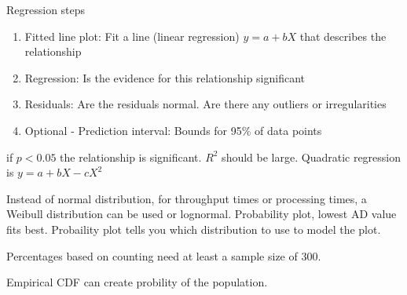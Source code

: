 \documentclass{notes}
\begin{document}
Regression steps
\begin{enumerate}
    \item Fitted line plot: Fit a line (linear regression) $y = a + bX$ that describes the relationship
    \item Regression: Is the evidence for this relationship significant
    \item Residuals: Are the residuals normal. Are there any outliers or irregularities
    \item Optional - Prediction interval: Bounds for 95\% of data points
\end{enumerate}
if $p<0.05$ the relationship is significant. $R^2$ should be large.
Quadratic regression is $y=a+bX-cX^2$

Instead of normal distribution, for throughput times or processing times, a Weibull distribution can be used or lognormal. 
Probability plot, lowest AD value fits best. Probaility plot tells you which distribution to use to model the plot.

Percentages based on counting need at least a sample size of 300.

Empirical CDF can create probility of the population.
\end{document}
